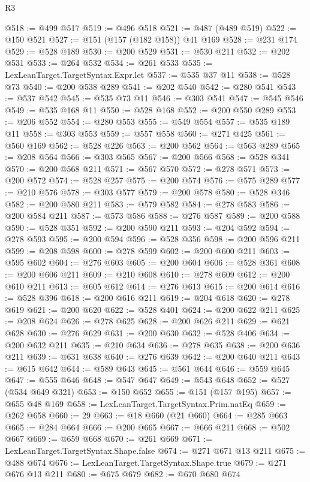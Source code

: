 \begin{lexlean}{R3}
\begin{coremodule}
@518 := @499 @517
@519 := @496 @518
@521 := @487 (@489 @519)
@522 := @150 @521
@527 := @151 (@157 (@182 @158)) @41 @169
@528 := @231 @174
@529 := @528 @189
@530 := @200 @529
@531 := @530 @211
@532 := @202 @531
@533 := @264 @532
@534 := @261 @533
@535 := LexLeanTarget.TargetSyntax.Expr.let
@537 := @535 @37 @11
@538 := @528 @73
@540 := @200 @538 @289
@541 := @202 @540
@542 := @280 @541
@543 := @537 @542
@545 := @535 @73 @11
@546 := @303 @541
@547 := @545 @546
@549 := @535 @168 @11
@550 := @528 @168
@552 := @200 @550 @289
@553 := @206 @552
@554 := @280 @553
@555 := @549 @554
@557 := @535 @189 @11
@558 := @303 @553
@559 := @557 @558
@560 := @271 @425
@561 := @560 @169
@562 := @528 @226
@563 := @200 @562
@564 := @563 @289
@565 := @208 @564
@566 := @303 @565
@567 := @200 @566
@568 := @528 @341
@570 := @200 @568 @211
@571 := @567 @570
@572 := @278 @571
@573 := @200 @572
@574 := @528 @257
@575 := @200 @574
@576 := @575 @289
@577 := @210 @576
@578 := @303 @577
@579 := @200 @578
@580 := @528 @346
@582 := @200 @580 @211
@583 := @579 @582
@584 := @278 @583
@586 := @200 @584 @211
@587 := @573 @586
@588 := @276 @587
@589 := @200 @588
@590 := @528 @351
@592 := @200 @590 @211
@593 := @204 @592
@594 := @278 @593
@595 := @200 @594
@596 := @528 @356
@598 := @200 @596 @211
@599 := @208 @598
@600 := @278 @599
@602 := @200 @600 @211
@603 := @595 @602
@604 := @276 @603
@605 := @200 @604
@606 := @528 @361
@608 := @200 @606 @211
@609 := @210 @608
@610 := @278 @609
@612 := @200 @610 @211
@613 := @605 @612
@614 := @276 @613
@615 := @200 @614
@616 := @528 @396
@618 := @200 @616 @211
@619 := @204 @618
@620 := @278 @619
@621 := @200 @620
@622 := @528 @401
@624 := @200 @622 @211
@625 := @208 @624
@626 := @278 @625
@628 := @200 @626 @211
@629 := @621 @628
@630 := @276 @629
@631 := @200 @630
@632 := @528 @406
@634 := @200 @632 @211
@635 := @210 @634
@636 := @278 @635
@638 := @200 @636 @211
@639 := @631 @638
@640 := @276 @639
@642 := @200 @640 @211
@643 := @615 @642
@644 := @589 @643
@645 := @561 @644
@646 := @559 @645
@647 := @555 @646
@648 := @547 @647
@649 := @543 @648
@652 := @527 (@534 @649 @321)
@653 := @150 @652
@655 := @151 (@157 @195)
@657 := @655 @48 @169
@658 := LexLeanTarget.TargetSyntax.Prim.natEq
@659 := @262 @658
@660 := 29
@663 := @18 @660 (@21 @660)
@664 := @285 @663
@665 := @284 @664
@666 := @200 @665
@667 := @666 @211
@668 := @502 @667
@669 := @659 @668
@670 := @261 @669
@671 := LexLeanTarget.TargetSyntax.Shape.false
@674 := @271 @671 @13 @211
@675 := @488 @674
@676 := LexLeanTarget.TargetSyntax.Shape.true
@679 := @271 @676 @13 @211
@680 := @675 @679
@682 := @670 @680 @674

\end{coremodule}
\end{lexlean}
